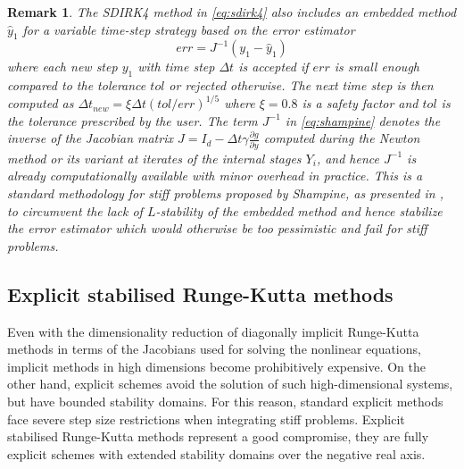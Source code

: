 \documentclass[10pt,a4paper]{article}
\newtheorem{remark}[theorem]{Remark}
\begin{document}
\begin{remark} \label{rem:variable_step}
{
The SDIRK4 method in \eqref{eq:sdirk4} also includes an embedded method $\hat y_1$ for a variable time-step strategy \cite{HaW96} based on the error estimator 
\begin{equation} \label{eq:shampine}
err=J^{-1}(y_1-\hat y_1)
\end{equation}
where each new step $y_1$ with time step $\Delta t$ is accepted if $err$ is small enough compared to the tolerance $tol$ or rejected otherwise. The next time step is then computed as $\Delta t_{new} = \xi \Delta t (tol/err)^{1/5}$ where $\xi=0.8$ is a safety factor and $tol$ is the tolerance prescribed by the user.
The term $J^{-1}$ in \eqref{eq:shampine} denotes the inverse of the Jacobian matrix $J=I_d-\Delta t \gamma \frac{\partial g}{\partial y}$ computed during the Newton method or its variant at iterates of the internal stages $Y_i$, and hence $J^{-1}$ is already computationally available with minor overhead in practice. This is a standard methodology for stiff problems proposed by Shampine, as presented in \cite[Sect.\thinspace IV.8]{HaW96}, to circumvent the lack of $L$-stability of the embedded method and hence  stabilize the error estimator which would otherwise be too pessimistic and fail for stiff problems. 
}
\end{remark}
       
        \subsection{Explicit stabilised Runge-Kutta methods} \label{sec:rkc}
        Even with the dimensionality reduction of diagonally implicit Runge-Kutta methods in terms of the Jacobians used for solving the nonlinear equations, implicit methods in high dimensions become prohibitively expensive. On the other hand, explicit schemes avoid the solution of such high-dimensional systems, but have bounded stability domains.  For this reason, standard explicit methods face severe step size restrictions when integrating stiff problems. Explicit stabilised Runge-Kutta methods represent a good compromise, they are fully explicit schemes with extended stability domains over the negative real axis. 
\end{document}
